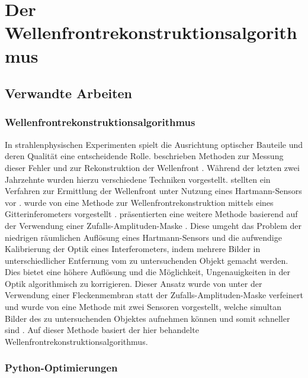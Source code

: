 \chapter{Der Wellenfrontrekonstruktionsalgorithmus}

\section{Verwandte Arbeiten}

\subsection{Wellenfrontrekonstruktionsalgorithmus}

In strahlenphysischen Experimenten spielt die Ausrichtung optischer Bauteile und deren Qualität eine entscheidende Rolle. \citeauthor{GNS+11} beschrieben \citeyear{GNS+11} Methoden zur Messung dieser Fehler und zur Rekonstruktion der Wellenfront \cite{GNS+11}. Während der letzten zwei Jahrzehnte wurden hierzu verschiedene Techniken vorgestellt. \citeauthor{MZI+03} stellten \citeyear{MZI+03} ein Verfahren zur Ermittlung der Wellenfront unter Nutzung eines Hartmann-Sensors vor \cite{MZI+03}. \citeyear{WND+05} wurde von \citeauthor{WND+05} eine Methode zur Wellenfrontrekonstruktion mittels eines Gitterinferometers vorgestellt \cite{WND+05}. \citeauthor{APO+07} präsentierten \citeyear{APO+07} eine weitere Methode basierend auf der Verwendung einer Zufalls-Amplituden-Maske \cite{APO+07}. Diese umgeht das Problem der niedrigen räumlichen Auflösung eines Hartmann-Sensors und die aufwendige Kalibrierung der Optik eines Interferometers, indem mehrere Bilder in unterschiedlicher Entfernung vom zu untersuchenden Objekt gemacht werden. Dies bietet eine höhere Auflösung und die Möglichkeit, Ungenauigkeiten in der Optik algorithmisch zu korrigieren. Dieser Ansatz wurde \citeyear{Ber12} von \citeauthor{Ber12} unter der Verwendung einer Fleckenmembran statt der Zufalls-Amplituden-Maske verfeinert \cite{Ber12} und \citeyear{Ber13} wurde von \citeauthor{Ber13} eine Methode mit zwei Sensoren vorgestellt, welche simultan Bilder des zu untersuchenden Objektes aufnehmen können und somit schneller sind \cite{Ber13}. Auf dieser Methode basiert der hier behandelte Wellenfrontrekonstruktionsalgorithmus. 

\subsection{Python-Optimierungen}

